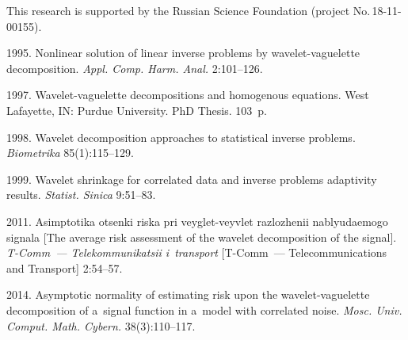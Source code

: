 





\Ack
\noindent
This research is supported by the Russian Science Foundation (project No.\,18-11-00155).
 



  \begin{multicols}{2}

\renewcommand{\bibname}{\protect\rmfamily References}

{\small\frenchspacing
 {%
 \begin{thebibliography}{99}
 

 1995. Nonlinear solution of linear inverse problems by wavelet-vaguelette decomposition.
\textit{Appl. Comp. Harm. Anal.} 2:101--126.

 1997. Wavelet-vaguelette decompositions and 
homogenous equations. West Lafayette, IN: Purdue University.  PhD Thesis. 103~p.

 1998. Wavelet decomposition approaches to statistical inverse problems. \textit{Biometrika} 85(1):115--129.

 1999. Wavelet shrinkage for correlated data and inverse problems adaptivity results. 
  \textit{Statist. Sinica} 9:51--83.

 2011. Asimp\-to\-ti\-ka otsen\-ki riska pri veyglet-veyvlet razlozhenii 
 nablyu\-da\-emo\-go signala 
 [The average risk assessment of the wavelet decomposition of the signal]. 
  \textit{T-Comm~--- Telekommunikatsii i~transport} [T-Comm~--- Telecommunications and Transport] 2:54--57.

 2014. Asymptotic normality of estimating risk upon the wavelet-vaguelette decomposition of 
 a~signal function in a~model with correlated noise. 
  \textit{Mosc. Univ. Comput. Math. Cybern.} 38(3):110--117.


\end{thebibliography}}}
\end{multicols}
